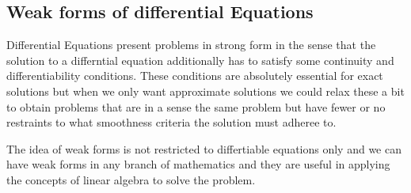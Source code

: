 \documentclass[12pt,a4paper]{article}
\begin{document}
	 \subsection{Weak forms of differential Equations}
	 
	 Differential Equations present problems in strong form in the sense that the solution to a differntial equation additionally has to satisfy some continuity and differentiability conditions.
	 These conditions are absolutely essential for exact solutions but when we only want approximate solutions we could relax these a bit to obtain problems that are in a sense the same problem but have fewer or no restraints to what smoothness criteria the solution must adheree to.
	 
	 The idea of weak forms is not restricted to differtiable equations only and we can have weak forms in any branch of mathematics and they are useful in applying the concepts of linear algebra to solve the problem. 
	
	
	
	
\end{document}
